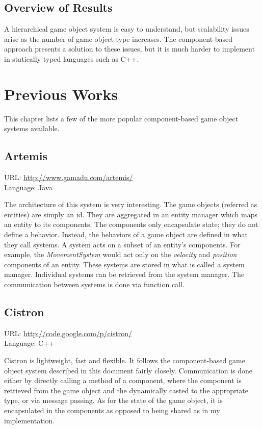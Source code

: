 \documentclass[
    phd,
    electronic,
    letterpaper,
    simplechapterheading,
    openany,
    parttop,
    lof,
]{byumsphd}
\begin{document}
\section{Overview of Results}

A hierarchical game object system is easy to understand, but scalability issues arise as the number of game object type increases. The component-based approach presents a solution to these issues, but it is much harder to implement in statically typed languages such as C++.


\chapter{Previous Works}

This chapter lists a few of the more popular component-based game object systems available.


\section{Artemis}

URL: \url{http://www.gamadu.com/artemis/} \\
Language: Java

The architecture of this system is very interesting. The game objects (referred as entities) are simply an id. They are aggregated in an entity manager which maps an entity to its components. The components only encapsulate state; they do not define a behavior. Instead, the behaviors of a game object are defined in what they call systems. A system acts on a subset of an entity's components. For example, the \textit{MovementSystem} would act only on the \textit{velocity} and \textit{position} components of an entity. These systems are stored in what is called a system manager. Individual systems can be retrieved from the system manager. The communication between systems is done via function call.


\section{Cistron}

URL: \url{http://code.google.com/p/cistron/} \\
Language: C++

Cistron is lightweight, fast and flexible. It follows the component-based game object system described in this document fairly closely. Communication is done either by directly calling a method of a component, where the component is retrieved from the game object and the dynamically casted to the appropriate type, or via message passing. As for the state of the game object, it is encapsulated in the components as opposed to being shared as in my implementation.
\end{document}
